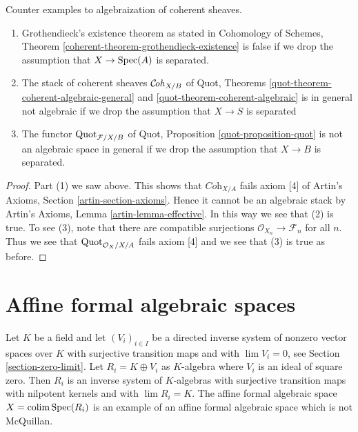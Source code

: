 \begin{lemma}
\label{lemma-counter-Grothendieck-existence}
Counter examples to algebraization of coherent sheaves.
\begin{enumerate}
\item Grothendieck's existence theorem as stated in
Cohomology of Schemes, Theorem \ref{coherent-theorem-grothendieck-existence}
is false if we drop the assumption that $X \to \mathop{\mathrm{Spec}}(A)$ is separated.
\item The stack of coherent sheaves $\mathcal{C}\!\mathit{oh}_{X/B}$
of Quot, Theorems \ref{quot-theorem-coherent-algebraic-general} and
\ref{quot-theorem-coherent-algebraic} is in general
not algebraic if we drop the assumption that $X \to S$ is separated
\item The functor $\mathrm{Quot}_{\mathcal{F}/X/B}$ of
Quot, Proposition \ref{quot-proposition-quot}
is not an algebraic space in general if we drop the assumption
that $X \to B$ is separated.
\end{enumerate}
\end{lemma}

\begin{proof}
Part (1) we saw above. This shows that $\textit{Coh}_{X/A}$ fails
axiom [4] of Artin's Axioms, Section \ref{artin-section-axioms}. Hence it
cannot be an algebraic stack by Artin's Axioms, Lemma
\ref{artin-lemma-effective}.
In this way we see that (2) is true. To see (3), note that
there are compatible surjections $\mathcal{O}_{X_n} \to \mathcal{F}_n$
for all $n$. Thus we see that $\mathrm{Quot}_{\mathcal{O}_X/X/A}$
fails axiom [4] and we see that (3) is true as before.
\end{proof}






\section{Affine formal algebraic spaces}
\label{section-affine-formal-algebraic-space}

\noindent
Let $K$ be a field and let $(V_i)_{i \in I}$ be a directed inverse
system of nonzero vector spaces over $K$ with surjective transition maps and
with $\lim V_i = 0$, see Section \ref{section-zero-limit}.
Let $R_i = K \oplus V_i$ as $K$-algebra where $V_i$ is
an ideal of square zero. Then $R_i$ is an inverse system of
$K$-algebras with surjective transition maps with nilpotent kernels
and with $\lim R_i = K$. The affine formal
algebraic space $X = \mathop{\mathrm{colim}}\nolimits \mathop{\mathrm{Spec}}(R_i)$ is an example of an affine
formal algebraic space which is not McQuillan.

